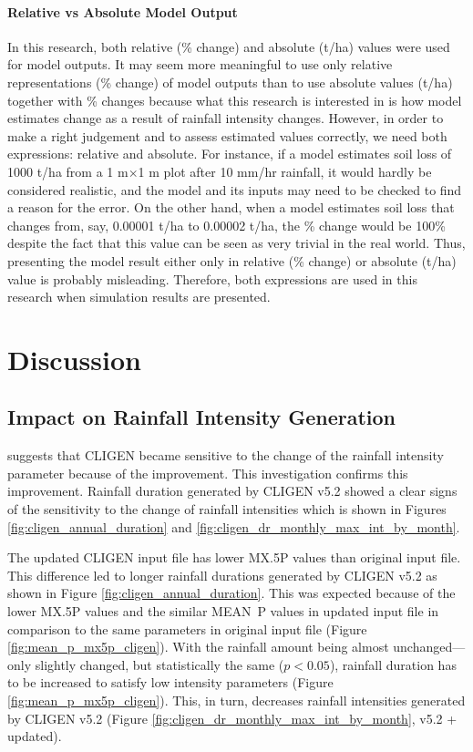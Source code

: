 \paragraph{Relative vs Absolute Model Output} In this research, both relative
(\% change) and absolute (t/ha) values were used for model outputs. It may seem
more meaningful to use only relative representations (\% change) of model
outputs than to use absolute values (t/ha) together with \% changes because what
this research is interested in is how model estimates change as a result of
rainfall intensity changes. However, in order to make a right judgement and to
assess estimated values correctly, we need both expressions: relative and
absolute. For instance, if a model estimates soil loss of 1000 t/ha from
a 1 m$\times$1 m plot after 10 mm/hr rainfall, it would hardly be considered
realistic, and the model and its inputs may need to be checked to find a reason
for the error. On the other hand, when a model estimates soil loss that changes
from, say, 0.00001 t/ha to 0.00002 t/ha, the \% change would be 100\% despite
the fact that this value can be seen as very trivial in the real world. Thus,
presenting the model result either only in relative (\% change) or absolute
(t/ha) value is probably misleading. Therefore, both expressions are used in
this research when simulation results are presented.

\section{Discussion}
\label{sec:ImprovedCLIGENDiscussion}

\subsection{Impact on Rainfall Intensity Generation}

\citet{yu2000-301} suggests that CLIGEN became sensitive to the change of the
rainfall intensity parameter because of the improvement. This investigation
confirms this improvement. Rainfall duration generated by CLIGEN v5.2
showed a clear signs of the sensitivity to the change of rainfall intensities
which is shown in Figures \ref{fig:cligen_annual_duration} and
\ref{fig:cligen_dr_monthly_max_int_by_month}.

The updated CLIGEN input file has lower {MX.5P} values than original input file.
This difference led to longer rainfall durations generated by CLIGEN v5.2
as shown in Figure \ref{fig:cligen_annual_duration}. This was expected because
of the lower {MX.5P} values and the similar MEAN~P values in updated input file
in comparison to the same parameters in original input file (Figure
\ref{fig:mean_p_mx5p_cligen}). With the rainfall amount being almost
unchanged---only slightly changed, but statistically the same ($p<0.05$),
rainfall duration has to be increased to satisfy low intensity parameters
(Figure \ref{fig:mean_p_mx5p_cligen}). This, in turn, decreases rainfall
intensities generated by CLIGEN v5.2 (Figure
\ref{fig:cligen_dr_monthly_max_int_by_month}, v5.2 + updated).

